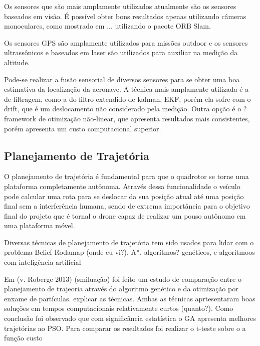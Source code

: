 Os sensores que são mais amplamente utilizados atualmente são os sensores baseados em visão. É possível obter bons resultados apenas utilizando câmeras monoculares, como mostrado em ... utilizando o pacote ORB Slam.

Os sensores GPS são amplamente utilizados para missões outdoor e os sensores ultrassônicos e baseados em laser são utilizados para auxiliar na medição da altitude.

Pode-se realizar a fusão sensorial de diversos sensores para se obter uma boa estimativa da localização da aeronave. A técnica mais amplamente utilizada é a de filtragem, como a do filtro extendido de kalman, EKF, porém ela sofre com o drift, que é um deslocamento não considerado pela medição. Outra opção é o ? framework de otimização não-linear, que apresenta resultados mais consistentes, porém apresenta um custo computacional superior.

\subsection{Planejamento de Trajetória}
O planejamento de trajetória é fundamental para que o quadrotor se torne uma plataforma completamente autônoma. Através dessa funcionalidade o veículo pode calcular uma rota para se deslocar da sua posição atual até uma posição final sem a interferência humana, sendo de extrema importância para o objetivo final do projeto que é tornal o drone capaz de realizar um pouso autônomo em uma plataforma móvel.

Diversas técnicas de planejamento de trajetória tem sido usados para lidar com o problema Belief Rodamap (onde eu vi?), A*, algorítmos? genéticos, e algorítmoos com inteligência artificial

Em (v. Roberge 2013) (smiluação) foi feito um estudo de comparação entre o planejamento de trajeoria através do algoritmo genético e da otimização por enxame de partículas. explicar as técnicas.
Ambas as técnicas aprtesentaram boas soluções em tempos computacionais relativamente curtos (quanto?). Como conclusão foi observado que com significância estatística o GA apresenta melhores trajetórias ao PSO. Para comparar os resultados foi realizar o t-teste sobre o a função custo

